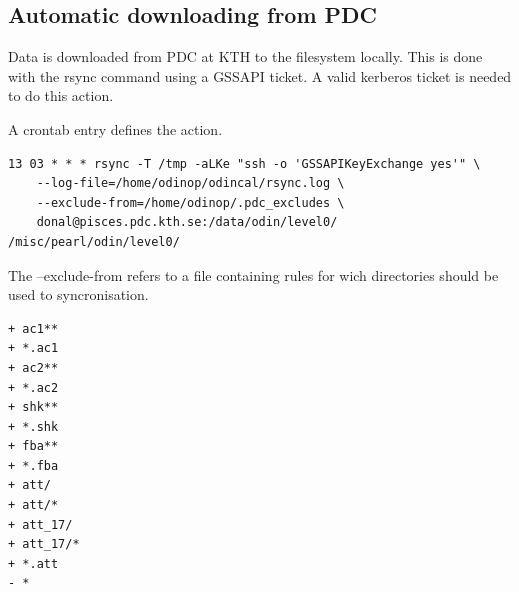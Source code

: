 \documentclass[12pt]{article}
\begin{document}
\subsection{Automatic downloading from PDC}
Data is downloaded from PDC at KTH to the filesystem locally. This is done with the rsync command using a GSSAPI ticket. A valid kerberos ticket is needed to do this action.

A crontab entry defines the action.
\begin{verbatim}
13 03 * * * rsync -T /tmp -aLKe "ssh -o 'GSSAPIKeyExchange yes'" \
    --log-file=/home/odinop/odincal/rsync.log \
    --exclude-from=/home/odinop/.pdc_excludes \
    donal@pisces.pdc.kth.se:/data/odin/level0/ /misc/pearl/odin/level0/
\end{verbatim}

The --exclude-from refers to a file containing rules for wich directories should be used to syncronisation.

\begin{verbatim}
+ ac1**
+ *.ac1
+ ac2**
+ *.ac2
+ shk**
+ *.shk
+ fba**
+ *.fba
+ att/
+ att/*
+ att_17/
+ att_17/*
+ *.att
- *
\end{verbatim}
\end{document}
